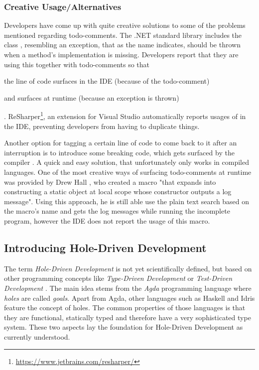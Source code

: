 \subsubsection{Creative Usage/Alternatives}
Developers have come up with quite creative solutions to some of the problems mentioned regarding todo-comments.
The .NET standard library includes the class \texttt{}, resembling an exception, that as the name indicates, should be thrown when a method's implementation is missing.
Developers report that they are using this together with todo-comments \cite{squires_use_2012} so that
\begin{enumerate*}[label=(\roman*)]
\item the line of code surfaces in the IDE (because of the todo-comment)
\item and surfaces at runtime (because an exception is thrown)
\end{enumerate*}.
ReSharper\footnote{\url{https://www.jetbrains.com/resharper/}}, an extension for Visual Studio automatically reports usages of \texttt{} in the IDE, preventing developers from having to duplicate things.

Another option for tagging a certain line of code to come back to it after an interruption is to introduce some breaking code, which gets surfaced by the compiler \cite{tackabury_how_2019}.
A quick and easy solution, that unfortunately only works in compiled languages.
One of the most creative ways of surfacing todo-comments at runtime was provided by Drew Hall \cite{tackabury_how_2019}, who created a \CC macro "that expands into constructing a static object at local scope whose constructor outputs a log message".
Using this approach, he is still able use the plain text search based on the macro's name and gets the log messages while running the incomplete program, however the IDE does not report the usage of this macro.



\subsection{Introducing Hole-Driven Development}
\label{sec:introducing-hole-driven-development}
The term \emph{Hole-Driven Development} is not yet scientifically defined, but based on other programming concepts like \emph{Type-Driven Development} \cite{brady_type-driven_2017} or \emph{Test-Driven Development} \cite{mccracken_digital_1957}.
The main idea stems from the \emph{Agda} programming language where \emph{holes} are called \emph{goals}.
Apart from Agda, other languages such as Haskell and Idris feature the concept of holes.
The common properties of those languages is that they are functional, statically typed and therefore have a very sophisticated type system.
These two aspects lay the foundation for Hole-Driven Development as currently understood.

